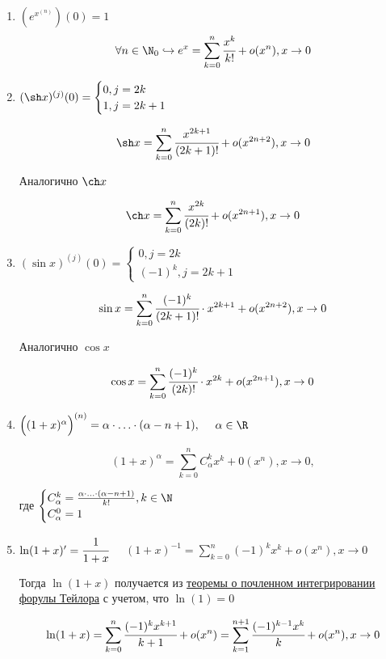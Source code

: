 \begin{enumerate}
	\item $(e^{x}^{(n)})(0) = 1$ 
	$$ \forall n \in \N_{0} \hookrightarrow e^{x} = \sum\limits_{k = 0}^{n} \cfrac{x^{k}}{k!} + o(x^{n}), x\to 0$$
	
	\item $(\sh x)^{(j)}(0) = \begin{cases}
		0, j = 2k \\
		1, j = 2k + 1
	\end{cases}$ 
	
	$$\sh x = \sum\limits_{k = 0}^{n} \cfrac{x^{2k+1}}{(2k+1)!} + o(x^{2n+2}), x\to 0$$
	
	Аналогично $\ch x$
	
	$$\ch x = \sum\limits_{k = 0}^{n} \cfrac{x^{2k}}{(2k)!} + o(x^{2n+1}), x\to 0$$
	
	\item $(\sin x)^{(j)}(0) = \begin{cases}
		0, j = 2k \\
		(-1)^{k}, j = 2k + 1
	\end{cases}$ 
	
	$$\sin x = \sum\limits_{k = 0}^{n} \cfrac{(-1)^{k}}{(2k+1)!} \cdot x^{2k+1} + o(x^{2n+2}), x\to 0$$
	
	Аналогично $\cos x$
	
	$$\cos x = \sum\limits_{k = 0}^{n} \cfrac{(-1)^{k}}{(2k)!} \cdot x^{2k} + o(x^{2n+1}), x\to 0$$
	
	\item $\Big((1 + x)^{\alpha}\Big)^{(n)} = \alpha\cdot\ldots\cdot (\alpha - n+1), \quad \ \alpha \in \R$
	
	$$(1 + x)^{\alpha} = \sum\limits_{k = 0}^{n} C_{\alpha}^{k}x^{k}  + 0(x^{n}), x\to 0,$$
	
	где $\begin{cases}
			C_{\alpha}^{k} = \frac{\alpha\cdot\ldots\cdot (\alpha - n+1)}{k!}, k \in \N \\
			C_{\alpha}^{0} = 1
		\end{cases}$
		
	\item $\ln(1+x)' = \cfrac{1}{1 + x}$ $\quad (1 + x)^{-1} = \sum\limits_{k = 0}^{n} (-1)^{k} x^{k} + o(x^{n}), x\to 0$ 
	
	Тогда $\ln(1 + x)$ получается из \hyperlink{thrm7.4}{теоремы о почленном интегрировании форулы Тейлора} с учетом, что $\ln(1) = 0$
	
	$$\ln(1 + x) = \sum\limits_{k =0}^{n} \cfrac{(-1)^{k} x^{k+1}}{k+1} + o(x^{n}) = \sum\limits_{k=1}^{n+1} \cfrac{(-1)^{k-1} x^{k}}{k} + o(x^{n}) , x\to 0$$
\end{enumerate}
